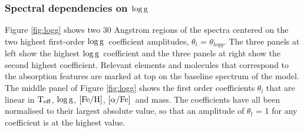 \documentclass[12pt, preprint]{aastex}
\newcommand{\teff}{\mbox{$\rm T_{eff}$}}
\newcommand{\feh}{\mbox{$\rm [Fe/H]$}}
\newcommand{\alphafe}{\mbox{$\rm [\alpha/Fe]$}}
\newcommand{\logg}{\mbox{$\rm \log g$}}
\begin{document}
\subsubsection{Spectral dependencies on \logg} 

Figure \ref{fig:logg} shows two 30 Angstrom regions of the spectra centered on the two highest first-order \logg\ coefficient amplitudes, $\theta_l$ = $\theta_{logg}$. The three panels at left show the highest \logg\ coefficient and the three panels at right show the second highest coefficient. Relevant elements and molecules that correspond to the absorption features are marked at top on the baseline spectrum of the model.  The middle panel of Figure \ref{fig:logg} shows the first order coefficients $\theta_l$ that are linear in \teff, \logg, \feh, \alphafe\ and mass. The coefficients have all been normalised to their largest absolute value, so that an amplitude of $\theta_l$ = 1 for any coefficient is at the highest value.  
\end{document}
